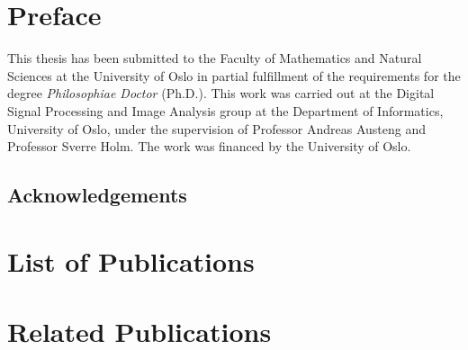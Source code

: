 \ifMonolithic\else\fi


\chapter*{Preface}

This thesis has been submitted to the Faculty of Mathematics and Natural Sciences at the University of Oslo in partial fulfillment of the requirements for the degree \emph{Philosophiae Doctor} (Ph.D.). This work was carried out at the Digital Signal Processing and Image Analysis group at the Department of Informatics, University of Oslo, under the supervision of Professor Andreas Austeng and Professor Sverre Holm. The work was financed by the University of Oslo.

\section*{Acknowledgements}



\newpage
\chapter*{List of Publications}

\newpage
\chapter*{Related Publications}


\ifMonolithic\else\fi